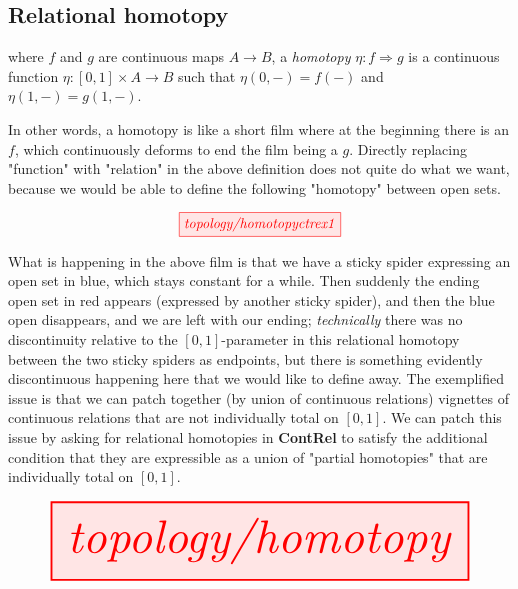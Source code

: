\clearpage

\subsection{Relational homotopy}

\begin{defn}
where $f$ and $g$ are continuous maps $A \rightarrow B$, a \emph{homotopy} $\eta : f \Rightarrow g$ is a continuous function $\eta : [0,1] \times A \rightarrow B$ such that $\eta(0,-) = f(-)$ and $\eta(1,-) = g(1,-)$.
\end{defn}

In other words, a homotopy is like a short film where at the beginning there is an $f$, which continuously deforms to end the film being a $g$. Directly replacing "function" with "relation" in the above definition does not quite do what we want, because we would be able to define the following "homotopy" between open sets.

\[\tikzfig{topology/homotopyctrex1}\]

What is happening in the above film is that we have a sticky spider expressing an open set in blue, which stays constant for a while. Then suddenly the ending open set in red appears (expressed by another sticky spider), and then the blue open disappears, and we are left with our ending; \emph{technically} there was no discontinuity relative to the $[0,1]$-parameter in this relational homotopy between the two sticky spiders as endpoints, but there is something evidently discontinuous happening here that we would like to define away. The exemplified issue is that we can patch together (by union of continuous relations) vignettes of continuous relations that are not individually total on $[0,1]$. We can patch this issue by asking for relational homotopies in \textbf{ContRel} to satisfy the additional condition that they are expressible as a union of "partial homotopies" that are individually total on $[0,1]$.

\clearpage

\begin{defn}\label{defn:homotopy}
\[\resizebox{\textwidth}{!}{\tikzfig{topology/homotopy}}\]
\end{defn}

